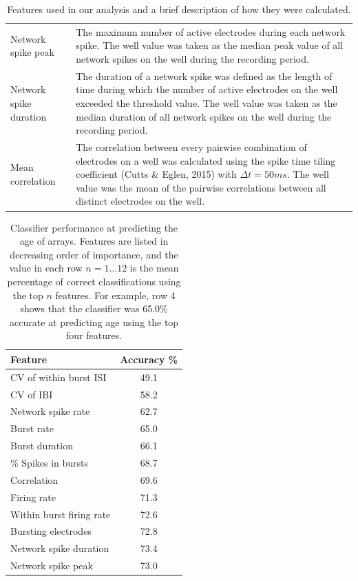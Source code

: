 \documentclass{article}
\begin{document}
\begin{table}
\begin{tabular}{|l|m{11cm}|}
  		\\ Network spike peak & The maximum number of active electrodes during each network spike. The well value was taken as the median peak value of all network spikes on the well during the recording period.
  		\\ Network spike duration & The duration of a network spike was defined as the length of time during which the  number of active electrodes on the well exceeded the threshold value. The well value was taken as the median duration of all network spikes on the well during the recording period.
  		\\ Mean correlation & The correlation between every pairwise combination of electrodes on a well was calculated using the spike time tiling coefficient (Cutts \& Eglen, 2015) with $\Delta t = 50ms$. The well value was the mean of the pairwise correlations between all distinct electrodes on the well.
  		\\ \hline
  	\end{tabular}
  \caption{Features used in our analysis and a brief description of how
    they were calculated.}
\end{table}

\begin{table}
  \centering
  \begin{tabular}{|l|c|}
  	\hline
  	\textbf{Feature} & \textbf{Accuracy \%}
  	\\ \hline 
  	CV of within burst ISI & 49.1
  	\\CV of IBI & 58.2
  	\\ Network spike rate& 62.7
  	\\ Burst rate & 65.0
  	\\ Burst duration& 66.1
  	\\ \% Spikes in bursts & 68.7
  	\\Correlation & 69.6
  	\\Firing rate & 71.3
  	\\Within burst firing rate & 72.6
  	\\Bursting electrodes & 72.8
  	\\ Network spike duration & 73.4
  	\\Network spike peak & 73.0
  	\\ \hline
  \end{tabular}
  \caption {Classifier performance at predicting the age of
arrays. Features are listed in decreasing order of importance, and the
value in each row $n=1 \ldots 12$ is the mean percentage of correct
classifications using the top $n$ features.  For example, row 4 shows
that the classifier was 65.0\% accurate at predicting age using the
top four features. }
\end{table}
\end{document}
